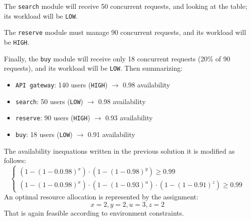 The \texttt{search} module will receive 50 concurrent requests, and looking at the table; its workload will be \texttt{LOW}.

The \texttt{reserve} module must manage 90 concurrent requests, and its workload will be \texttt{HIGH}. 

Finally, the \texttt{buy} module will receive only 18 concurrent requests (20\% of 90 requests), and its workload will be \texttt{LOW}. Then summarizing:
\begin{itemize}
    \item \texttt{API gateway}: 140 users (\texttt{HIGH}) $\rightarrow$ 0.98 availability

    \item \texttt{search}: 50 users (\texttt{LOW}) $\rightarrow$ 0.98 availability

    \item \texttt{reserve}: 90 users (\texttt{HIGH}) $\rightarrow$ 0.93 availability

    \item \texttt{buy}: 18 users (\texttt{LOW}) $\rightarrow$ 0.91 availability
\end{itemize}
The availability inequations written in the previous solution it is modified as follows:
\begin{equation*}
    \begin{cases}
        \left(1-\left(1-0.0.98\right)^{x}\right) \cdot \left(1-\left(1-0.98\right)^{y}\right) \ge 0.99 \\
        \left(1-\left(1-0.0.98\right)^{x}\right) \cdot \left(1-\left(1-0.93\right)^{u}\right) \cdot \left(1-\left(1-0.91\right)^{z}\right) \ge 0.99
    \end{cases}
\end{equation*}
An optimal resource allocation is represented by the assignment:
\begin{equation*}
    x = 2, y = 2, u = 3, z = 2
\end{equation*}
That is again feasible according to environment constraints.